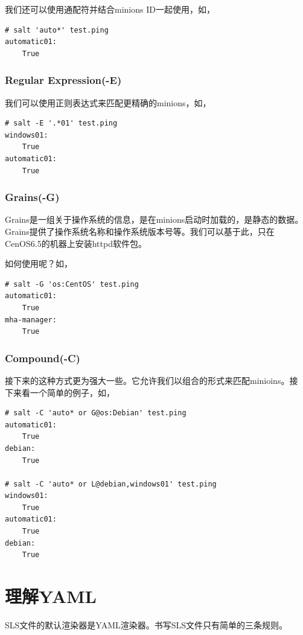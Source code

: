 我们还可以使用通配符并结合minions ID一起使用，如，

\begin{verbatim}
# salt 'auto*' test.ping
automatic01:
    True
\end{verbatim}

\subsubsection*{Regular Expression(-E)}

我们可以使用正则表达式来匹配更精确的minions，如，

\begin{verbatim}
# salt -E '.*01' test.ping
windows01:
    True
automatic01:
    True
\end{verbatim}

\subsubsection*{Grains(-G)}

Grains是一组关于操作系统的信息，是在minions启动时加载的，是静态的数据。
Grains提供了操作系统名称和操作系统版本号等。我们可以基于此，只在
CenOS6.5的机器上安装httpd软件包。

如何使用呢？如，

\begin{verbatim}
# salt -G 'os:CentOS' test.ping
automatic01:
    True
mha-manager:
    True
\end{verbatim}

\subsubsection*{Compound(-C)}

接下来的这种方式更为强大一些。它允许我们以组合的形式来匹配minioins。接
下来看一个简单的例子，如，

\begin{verbatim}
# salt -C 'auto* or G@os:Debian' test.ping
automatic01:
    True
debian:
    True

# salt -C 'auto* or L@debian,windows01' test.ping
windows01:
    True
automatic01:
    True
debian:
    True
\end{verbatim}

\section{理解YAML}
\label{sec:understandYAML}

SLS文件的默认渲染器是YAML渲染器。书写SLS文件只有简单的三条规则。

